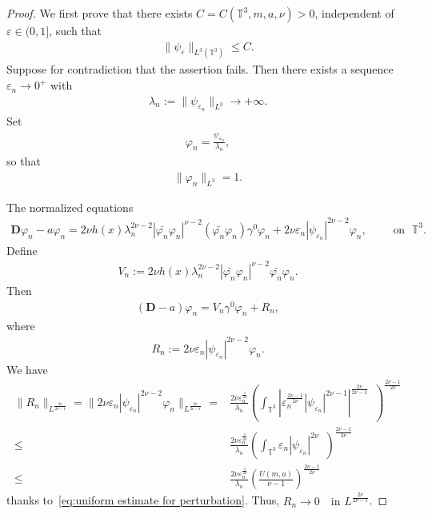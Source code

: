 \documentclass[11pt,final]{amsart}
\newcommand{\parenthesis}[1]{\left(#1\right)} %
\newcommand{\T}{\mathbb{T}}
\newcommand{\dd}{\mathop{}\!\mathrm{d}}
\newcommand{\eps}{\varepsilon}
\newcommand{\pD}{\mathbf{D}}
\DeclareMathOperator{\dv}{\dd{vol}}
\begin{document}
\begin{proof}
We first prove that there exists $C=C(\mathbb{T}^3,m,a,\nu)>0$, independent of $\eps\in(0,1]$, such that
\begin{align}
\|\psi_\eps\|_{L^3(\T^3)}\leq C.
\end{align}
Suppose for contradiction that the assertion fails. Then there exists a sequence $\eps_n\to0^+$ with
\begin{align}
\lambda_n :=
\|\psi_{\eps_n}\|_{L^3}
\to+\infty.
\end{align}
Set
\begin{align}
\varphi_n=\frac{\psi_{\eps_n}}{\lambda_n},
\end{align}
so that
\begin{align}
\|\varphi_n\|_{L^3}=1.
\end{align}


The normalized equations
\begin{align}\label{eq:normalized eqn}
    \pD\varphi_n-a\varphi_n=2\nu h(x)\lambda_n^{2\nu-2}|\bar{\varphi_n}\varphi_n|^{\nu-2}(\bar{\varphi_n}\varphi_n)\gamma^0\varphi_n + 2\nu\eps_n |\psi_{\eps_n}|^{2\nu -2 }\varphi_n, \qquad \mbox{ on } \; \T^3.
\end{align}
Define
\begin{align}
V_n
:=
2\nu h(x)\lambda_n^{2\nu-2}
\left|\bar{\varphi_n}\varphi_n\right|^{\nu-2}\bar{\varphi_n}\varphi_n.
\end{align}
Then
\begin{align}
(\pD-a)\varphi_n
=
V_n
\gamma^0\varphi_n
+
R_n,
\end{align}
where
\begin{align}
R_n
:=
2\nu\eps_n
|\psi_{\eps_n}|^{2\nu-2}\varphi_n.
\end{align}
We have
\begin{align}
   \|R_n\|_{L^{\frac{2\nu}{2\nu -1}}}=\|2\nu\eps_n |\psi_{\eps_n}|^{2\nu -2 }\varphi_n \|_{L^{\frac{2\nu}{2\nu -1}}}
    = & \frac{2\nu \eps_n^{\frac{1}{2\nu}} }{\lambda_n}
     \parenthesis{ \int_{\T^3} \left|\eps_n^{\frac{2\nu-1}{2\nu}} |\psi_{\eps_n}|^{2\nu -1} \right|^{\frac{2\nu}{2\nu-1}} \dv   }^{\frac{2\nu-1}{2\nu}}\\
    \leq& \frac{2\nu \eps_n^{\frac{1}{2\nu}} }{\lambda_n}
    \parenthesis{ \int_{\T^3} \eps_n |\psi_{\eps_n}|^{2\nu}\dv}^{\frac{2\nu-1}{2\nu}} \\
    \leq& \frac{2\nu \eps_n^{\frac{1}{2\nu}} }{\lambda_n}\parenthesis{ \frac{U(m,a)}{\nu-1} }^{\frac{2\nu-1}{2\nu}}
\end{align}
thanks to~\eqref{eq:uniform estimate for perturbation}.
 Thus, $R_n\to0
\quad\text{in }L^{\frac{2\nu}{2\nu-1}}$.





\end{proof}
\end{document}
